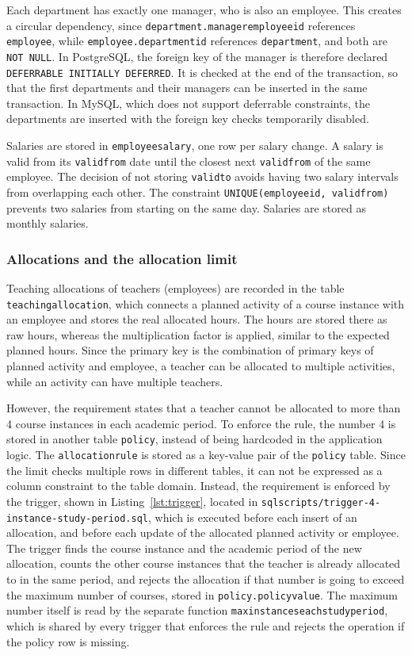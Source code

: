 \documentclass[a4paper]{scrartcl}
\renewcommand{\_}{\textunderscore\allowbreak}
\begin{document}
Each department has exactly one manager, who is also an employee. This creates a circular dependency, since \texttt{department.manager\_employee\_id} references \texttt{employee}, while \texttt{employee.department\_id} references \texttt{department}, and both are \texttt{NOT NULL}. In PostgreSQL, the foreign key of the manager is therefore declared \texttt{DEFERRABLE INITIALLY DEFERRED}. It is checked at the end of the transaction, so that the first departments and their managers can be inserted in the same transaction. In MySQL, which does not support deferrable constraints, the departments are inserted with the foreign key checks temporarily disabled.

Salaries are stored in \texttt{employee\_salary}, one row per salary change. A salary is valid from its \texttt{valid\_from} date until the closest next \texttt{valid\_from} of the same employee. The decision of not storing \texttt{valid\_to} avoids having two salary intervals from overlapping each other. The constraint \texttt{UNIQUE(employee\_id, valid\_from)} prevents two salaries from starting on the same day. Salaries are stored as monthly salaries.

\subsubsection{Allocations and the allocation limit}
\label{sec:allocations}

Teaching allocations of teachers (employees) are recorded in the table \texttt{teaching\_allocation}, which connects a planned activity of a course instance with an employee and stores the real allocated hours. The hours are stored there as raw hours, whereas the multiplication factor is applied, similar to the expected planned hours. Since the primary key is the combination of primary keys of planned activity and employee, a teacher can be allocated to multiple activities, while an activity can have multiple teachers.

However, the requirement states that a teacher cannot be allocated to more than 4 course instances in each academic period. To enforce the rule, the number 4 is stored in another table \texttt{policy}, instead of being hardcoded in the application logic. The \texttt{allocation\_rule} is stored as a key-value pair of the \texttt{policy} table. Since the limit checks multiple rows in different tables, it can not be expressed as a column constraint to the table domain. Instead, the requirement is enforced by the trigger, shown in Listing~\ref{lst:trigger}, located in \texttt{sql\_scripts/trigger-4-instance-study-period.sql}, which is executed before each insert of an allocation, and before each update of the allocated planned activity or employee. The trigger finds the course instance and the academic period of the new allocation, counts the other course instances that the teacher is already allocated to in the same period, and rejects the allocation if that number is going to exceed the maximum number of courses, stored in \texttt{policy.policy\_value}. The maximum number itself is read by the separate function \texttt{max\_instances\_each\_study\_period}, which is shared by every trigger that enforces the rule and rejects the operation if the policy row is missing.
\end{document}
